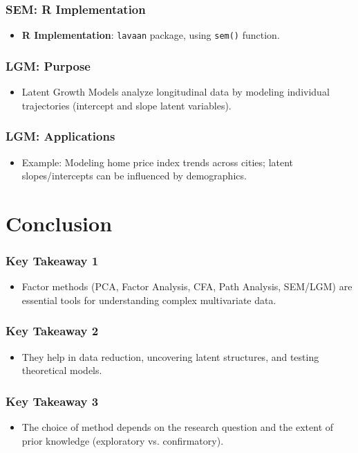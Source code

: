 \documentclass{beamer}
\newcommand{\code}[1]{\texttt{#1}}
\begin{document}
\begin{frame}
    \frametitle{SEM: R Implementation}
    \begin{itemize}
        \item \textbf{R Implementation}: \code{lavaan} package, using \code{sem()} function.
    \end{itemize}
\end{frame}

\begin{frame}
    \frametitle{LGM: Purpose}
    \begin{itemize}
        \item Latent Growth Models analyze longitudinal data by modeling individual trajectories (intercept and slope latent variables).
    \end{itemize}
\end{frame}

\begin{frame}
    \frametitle{LGM: Applications}
    \begin{itemize}
        \item Example: Modeling home price index trends across cities; latent slopes/intercepts can be influenced by demographics.
    \end{itemize}
\end{frame}

\section{Conclusion}

\begin{frame}
    \frametitle{Key Takeaway 1}
    \begin{itemize}
        \item Factor methods (PCA, Factor Analysis, CFA, Path Analysis, SEM/LGM) are essential tools for understanding complex multivariate data.
    \end{itemize}
\end{frame}

\begin{frame}
    \frametitle{Key Takeaway 2}
    \begin{itemize}
        \item They help in \alert{data reduction}, uncovering \alert{latent structures}, and \alert{testing theoretical models}.
    \end{itemize}
\end{frame}

\begin{frame}
    \frametitle{Key Takeaway 3}
    \begin{itemize}
        \item The choice of method depends on the research question and the extent of prior knowledge (exploratory vs. confirmatory).
    \end{itemize}
\end{frame}
\end{document}
